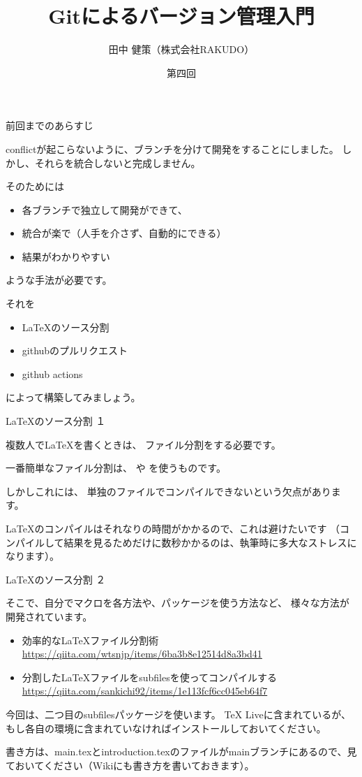 \documentclass[12pt, unicode]{beamer}
\title{Gitによるバージョン管理入門}
\author{田中 健策（株式会社RAKUDO）}
\date[2020/12/25]{第四回}
\begin{document}
\frame{\maketitle}

\begin{frame}{前回までのあらすじ}

conflictが起こらないように、ブランチを分けて開発をすることにしました。
しかし、それらを統合しないと完成しません。

そのためには

\begin{itemize}
\item 各ブランチで独立して開発ができて、
\item 統合が楽で（人手を介さず、自動的にできる）
\item 結果がわかりやすい
\end{itemize}

ような手法が必要です。

それを
\begin{itemize}
\item LaTeXのソース分割
\item githubのプルリクエスト
\item github actions
\end{itemize}
によって構築してみましょう。

\end{frame}

\begin{frame}[fragile]{\LaTeX のソース分割 １}

複数人でLaTeXを書くときは、
ファイル分割をする必要です。

一番簡単なファイル分割は、
\verb||
や
\verb||
を使うものです。

しかしこれには、
単独のファイルでコンパイルできないという欠点があります。

LaTeXのコンパイルはそれなりの時間がかかるので、これは避けたいです
（コンパイルして結果を見るためだけに数秒かかるのは、執筆時に多大なストレスになります）。

\end{frame}
\begin{frame}{\LaTeX のソース分割 ２}

そこで、自分でマクロを各方法や、パッケージを使う方法など、
様々な方法が開発されています。

\begin{itemize}
\item 効率的なLaTeXファイル分割術 \url{https://qiita.com/wtsnjp/items/6ba3b8e12514d8a3bd41}
\item 分割したLaTeXファイルをsubfilesを使ってコンパイルする　\url{https://qiita.com/sankichi92/items/1e113fcf6cc045eb64f7}
\end{itemize}

今回は、二つ目のsubfilesパッケージを使います。
TeX Liveに含まれているが、もし各自の環境に含まれていなければインストールしておいてください。

書き方は、main.texとintroduction.texのファイルがmainブランチにあるので、見ておいてください（Wikiにも書き方を書いておきます）。

\end{frame}
\end{document}
